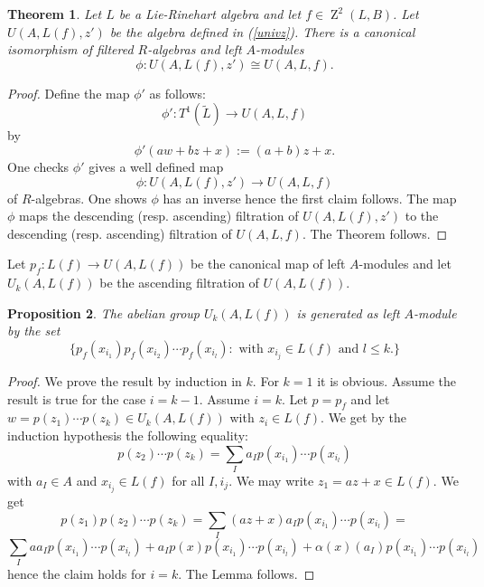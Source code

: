 \documentclass{amsart}
\theoremstyle{plain}
\newtheorem{theorem}{Theorem}[section]
\newtheorem{proposition}[theorem]{Proposition}
\theoremstyle{definition}
\theoremstyle{remark}
\numberwithin{equation}{theorem}
\begin{document}
\begin{theorem} \label{caniso} Let $L$ be a Lie-Rinehart algebra and let $f\in {\operatorname{Z}}^2(L,B)$.
Let $U({A},L(f),z')$ be the algebra defined in (\ref{univz}).
There is a canonical  isomorphism of filtered ${R}$-algebras and left ${A}$-modules
\[ \phi: U({A},L(f), z')\cong U({A},L,f).  \]
\end{theorem}
\begin{proof} Define the map $\phi'$ as follows:
\[ \phi':T^1(\tilde{L})\rightarrow U({A},L,f) \]
by
\[\phi'(aw+bz+x):=(a+b)z+x.\]
One checks $\phi'$ gives a well defined map 
\[ \phi: U({A},L(f),z')\rightarrow U({A},L,f) \]
of ${R}$-algebras.
One shows $\phi$ has an inverse hence the first claim follows. The map $\phi$ maps the descending (resp. ascending) filtration
of $U({A},L(f),z')$ to the descending (resp. ascending) filtration of $U({A},L,f)$. The Theorem follows.
\end{proof}

Let $p_f:L(f)\rightarrow U({A},L(f))$ be the canonical map of left ${A}$-modules and let $U_k(A,L(f))$ be the ascending
filtration of $U(A,L(f))$.

\begin{proposition} \label{generated} The abelian group $U_k({A},L(f))$ is generated as left ${A}$-module by the set
\[ \{ p_f(x_{i_1})p_f(x_{i_2})\cdots p_f(x_{i_l}) :\text{ with $x_{i_j}\in L(f)$ and $l\leq k$.}  \} \]
\end{proposition}
\begin{proof} We prove the result by induction in $k$. For $k=1$ it is obvious. Assume the result is true for the case $i=k-1$.
Assume $i=k$. Let $p=p_f$ and let $w=p(z_1)\cdots p(z_k)\in U_k({A},L(f))$ with $z_i\in L(f)$. We get by the induction
hypothesis the following equality:
\[ p(z_2)\cdots p(z_k)=\sum_I a_I p(x_{i_1})\cdots p(x_{i_l}) \]
with $a_I\in {A}$ and $x_{i_j}\in L(f)$ for all $I, i_j$. We may write $z_1=az+x\in L(f)$. We get
\[ p(z_1)p(z_2)\cdots p(z_k)= \sum_I (az+x)a_I p(x_{i_1})\cdots p(x_{i_l}) =\]
\[ \sum_I aa_Ip(x_{i_1})\cdots p(x_{i_l})+a_Ip(x)p(x_{i_1})\cdots p(x_{i_l}) +\alpha(x)(a_I)p(x_{i_1})\cdots p(x_{i_l}) \]
hence the claim holds for $i=k$. The Lemma follows.
\end{proof}
\end{document}
